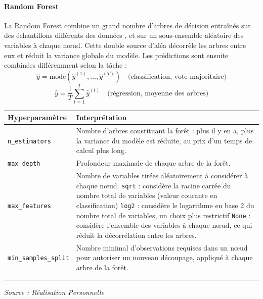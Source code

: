 \documentclass[a4paper,12pt, oneside]{article}
\begin{document}
\paragraph{Random Forest\\}
La Random Forest combine un grand nombre d'arbres de décision entraînés sur des échantillons différents des données , et sur un sous-ensemble aléatoire des variables à chaque nœud. Cette double source d'aléa décorrèle les arbres entre eux et réduit la variance globale du modèle. Les prédictions sont ensuite combinées différemment selon la tâche :
\[
\hat{y} = \text{mode}\left(\hat{y}^{(1)}, \dots, \hat{y}^{(T)}\right) \quad \text{(classification, vote majoritaire)}
\]
\[
\hat{y} = \frac{1}{T}\sum_{t=1}^{T} \hat{y}^{(t)} \quad \text{(régression, moyenne des arbres)}
\]



\begin{longtable}{|m{5cm}|m{12cm}|}
\hline
\textbf{Hyperparamètre} & \textbf{Interprétation} \\
\hline
\texttt{n\_estimators} & Nombre d'arbres constituant la forêt : plus il y en a, plus la variance du modèle est réduite, au prix d'un temps de calcul plus long. \\
\hline
\texttt{max\_depth} & Profondeur maximale de chaque arbre de la forêt. \\
\hline
\texttt{max\_features} & Nombre de variables tirées aléatoirement à considérer à chaque nœud. \newline \texttt{sqrt} : considère la racine carrée du nombre total de variables (valeur courante en classification) \newline \texttt{log2} : considère le logarithme en base 2 du nombre total de variables, un choix plus restrictif \newline\texttt{None} : considère l'ensemble des variables à chaque nœud, ce qui réduit la décorrélation entre les arbres. \\
\hline
\texttt{min\_samples\_split} & Nombre minimal d'observations requises dans un nœud pour autoriser un nouveau découpage, appliqué à chaque arbre de la forêt. \\
\hline
\caption{Hyperparamètres -- Random Forest\\}
\end{longtable}
\begin{center}
\vspace{-0.7cm}
\textit{Source : Réalisation Personnelle}
\end{center}
\end{document}
